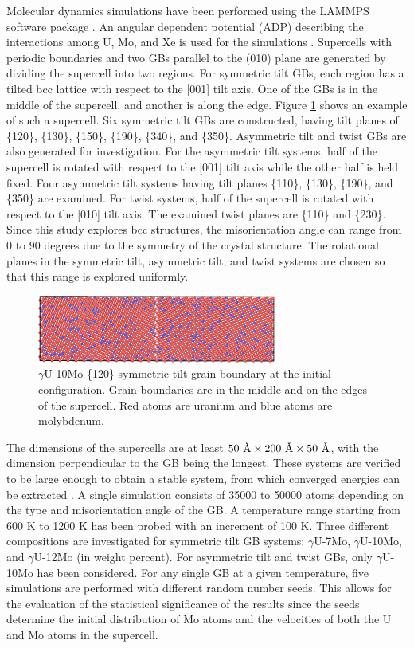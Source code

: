 \documentclass{elsarticle}
\begin{document}
Molecular dynamics simulations have been performed using the LAMMPS software package \cite{lammps}. An angular dependent potential (ADP) describing the interactions among U, Mo, and Xe is used for the simulations \cite{starikov2018, beelerUMoXe}. Supercells with periodic boundaries and two GBs parallel to the (010) plane are generated by dividing the supercell into two regions. For symmetric tilt GBs, each region has a tilted bcc lattice with respect to the [001] tilt axis. One of the GBs is in the middle of the supercell, and another is along the edge. Figure \ref{fig:gb} shows an example of such a supercell. Six symmetric tilt GBs are constructed, having tilt planes of \{120\}, \{130\}, \{150\}, \{190\}, \{340\}, and \{350\}. Asymmetric tilt and twist GBs are also generated for investigation. For the asymmetric tilt systems, half of the supercell is rotated with respect to the [001] tilt axis while the other half is held fixed. Four asymmetric tilt systems having tilt planes \{110\}, \{130\}, \{190\}, and \{350\} are examined. For twist systems, half of the supercell is rotated with respect to the [010] tilt axis. The examined twist planes are \{110\} and \{230\}. Since this study explores bcc structures, the misorientation angle can range from $0$ to $90$ degrees due to the symmetry of the crystal structure. The rotational planes in the symmetric tilt, asymmetric tilt, and twist systems are chosen so that this range is explored uniformly.

\begin{figure}[!ht]
\centering
\includegraphics[width=0.70\textwidth]{configuration.png}
\caption{$\gamma$U-10Mo \{120\} symmetric tilt grain boundary at the initial configuration. Grain boundaries are in the middle and on the edges of the supercell. Red atoms are uranium and blue atoms are molybdenum.}
\label{fig:gb}
\end{figure}

The dimensions of the supercells are at least $50 \text{ \r{A}} \times 200 \text{ \r{A}} \times 50 \text{ \r{A}}$, with the dimension perpendicular to the GB being the longest. These systems are verified to be large enough to obtain a stable system, from which converged energies can be extracted \cite{beeler2018}. A single simulation consists of 35000 to 50000 atoms depending on the type and misorientation angle of the GB. A temperature range starting from 600 K to 1200 K has been probed with an increment of 100 K. Three different compositions are investigated for symmetric tilt GB systems: $\gamma$U-7Mo, $\gamma$U-10Mo, and $\gamma$U-12Mo (in weight percent). For asymmetric tilt and twist GBs, only $\gamma$U-10Mo has been considered. For any single GB at a given temperature, five simulations are performed with different random number seeds. This allows for the evaluation of the statistical significance of the results since the seeds determine the initial distribution of Mo atoms and the velocities of both the U and Mo atoms in the supercell.
\end{document}
